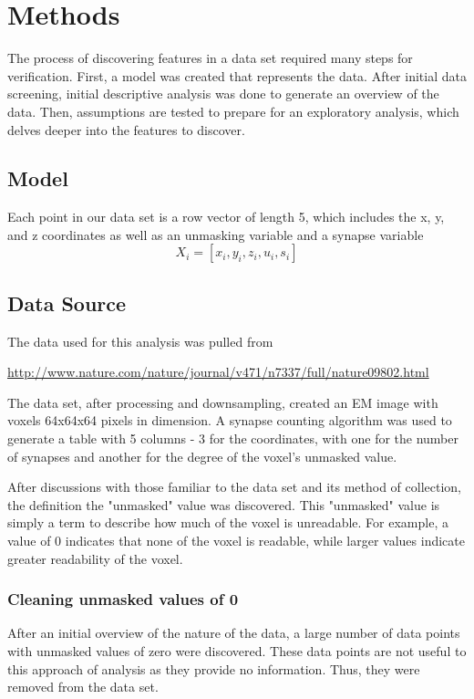 \documentclass{article}
\begin{document}
\section{Methods}

The process of discovering features in a data set required many steps for verification. First, a model was created that represents the data. After initial data screening, initial descriptive analysis was done to generate an overview of the data. Then, assumptions are tested to prepare for an exploratory analysis, which delves deeper into the features to discover.

\subsection{Model}

Each point in our data set is a row vector of length 5, which includes the x, y, and z coordinates as well as an unmasking variable and a synapse variable \[ X_i = [x_i, y_i, z_i, u_i, s_i] \]

\subsection{Data Source}

The data used for this analysis was pulled from
\begin{center}
  \url{http://www.nature.com/nature/journal/v471/n7337/full/nature09802.html}
\end{center}

The data set, after processing and downsampling, created an EM image with voxels 64x64x64 pixels in dimension. A synapse counting algorithm was used to generate a table with 5 columns - 3 for the coordinates, with one for the number of synapses and another for the degree of the voxel's unmasked value. 

After discussions with those familiar to the data set and its method of collection, the definition the "unmasked" value was discovered. This "unmasked" value is simply a term to describe how much of the voxel is unreadable. For example, a value of 0 indicates that none of the voxel is readable, while larger values indicate greater readability of the voxel.

\subsubsection{Cleaning unmasked values of 0}

After an initial overview of the nature of the data, a large number of data points with unmasked values of zero were discovered. These data points are not useful to this approach of analysis as they provide no information. Thus, they were removed from the data set.
\end{document}
